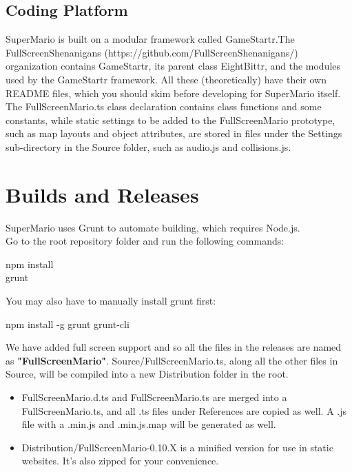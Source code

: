 \documentclass{article}
\begin{document}
\subsection{Coding Platform}
SuperMario is built on a modular framework called GameStartr.The FullScreenShenanigans (https://github.com/FullScreenShenanigans/) organization contains GameStartr, its parent class EightBittr, and the modules used by the GameStartr framework. All these (theoretically) have their own README files, which you should skim before developing for SuperMario itself.\\
The FullScreenMario.ts class declaration contains class functions and some constants, while static settings to be added to the FullScreenMario prototype, such as map layouts and object attributes, are stored in files under the Settings sub-directory in the Source folder, such as audio.js and collisions.js.
\pagebreak
\section{Builds and Releases}
SuperMario uses Grunt to automate building, which requires Node.js.\\
Go to the root repository folder and run the following commands:\\
		\begin{center}		
		npm install\\
		grunt\\
		\end{center}
You may also have to manually install grunt first:\\
		\begin{center}
		npm install -g grunt grunt-cli\\
		\end{center}
	We have added full screen support and so all the files in the releases are named as \textbf{"FullScreenMario"}.
Source/FullScreenMario.ts, along all the other files in Source, will be compiled into a new Distribution folder in the root.\\
\begin{itemize}
\item	FullScreenMario.d.ts and FullScreenMario.ts are merged into a FullScreenMario.ts, and all .ts files under References are copied as well. A .js file with a .min.js and .min.js.map will be generated as well.
\item	Distribution/FullScreenMario-0.10.X is a minified version for use in static websites. It's also zipped for your convenience.
\end{itemize}
\end{document}
